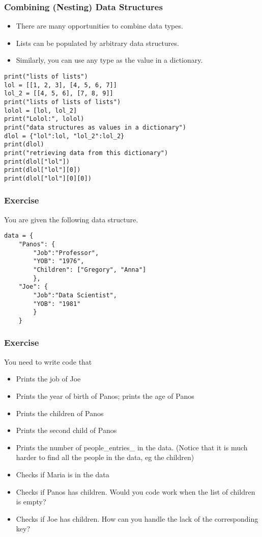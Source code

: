 \begin{frame}[fragile]\frametitle{Combining (Nesting) Data Structures}
\begin{itemize}
\item There are many opportunities to combine data types. 
\item Lists can be populated by arbitrary data structures. 
\item Similarly, you can use any type as the value in a dictionary. 
\end{itemize}
\begin{lstlisting}
print("lists of lists")
lol = [[1, 2, 3], [4, 5, 6, 7]]
lol_2 = [[4, 5, 6], [7, 8, 9]]
print("lists of lists of lists")
lolol = [lol, lol_2]
print("Lolol:", lolol)
print("data structures as values in a dictionary")
dlol = {"lol":lol, "lol_2":lol_2}
print(dlol)
print("retrieving data from this dictionary")
print(dlol["lol"])
print(dlol["lol"][0])
print(dlol["lol"][0][0])
\end{lstlisting}

\end{frame}


\begin{frame}[fragile]\frametitle{Exercise}
You are given the following data structure.
\begin{lstlisting}
data = {
    "Panos": {
        "Job":"Professor", 
        "YOB": "1976", 
        "Children": ["Gregory", "Anna"]
        }, 
    "Joe": {
        "Job":"Data Scientist", 
        "YOB": "1981"
        }
    }
\end{lstlisting}
\end{frame}

\begin{frame}[fragile]\frametitle{Exercise}
You need to write code that

\begin{itemize}
\item Prints the job of Joe
\item Prints the year of birth of Panos; prints the age of Panos
\item Prints the children of Panos
\item Prints the second child of Panos
\item Prints the number of people\_entries\_ in the data. (Notice that it is much harder to find all the people in the data, eg the children)
\item Checks if Maria is in the data
\item Checks if Panos has children. Would you code work when the list of children is empty?
\item Checks if Joe has children. How can you handle the lack of the corresponding key?
\end{itemize}
\end{frame}

